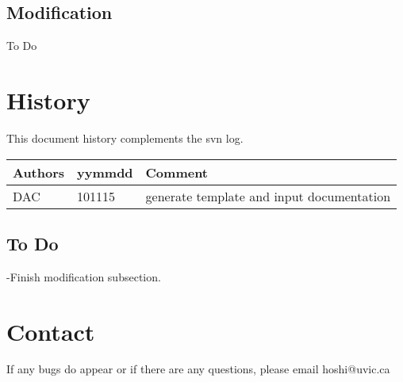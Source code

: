 \subsection{Modification}
To Do
\section{History} 
This document history complements the svn log.

\begin{tabular*}{\textwidth}{lll}
\hline
Authors & yymmdd & Comment \\
\hline
DAC & 101115 & generate template and input documentation\\

\hline
\end{tabular*}
\subsection{To Do}
-Finish modification subsection.


\section{Contact}
If any bugs do appear or if there are any questions, please email hoshi@uvic.ca



%
%
%
%
